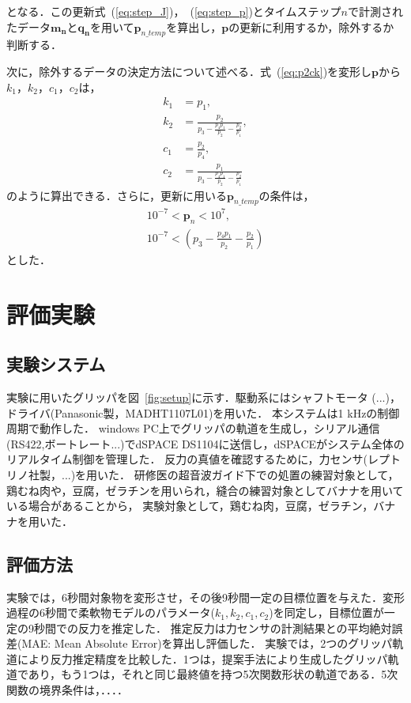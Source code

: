 \documentclass[a4paper]{jarticle}
\begin{document}
となる．この更新式~(\ref{eq:step_J})，~(\ref{eq:step_p})とタイムステップ$n$で計測されたデータ$\mathbf{m_{n}}$と$\mathbf{q_{n}}$を用いて$\mathbf{p}_{n\_temp}$を算出し，$\mathbf{p}$の更新に利用するか，除外するか判断する．

次に，除外するデータの決定方法について述べる．式~(\ref{eq:p2ck})を変形し$\mathbf{p}$から$k_1$，$k_2$，$c_1$，$c_2$は，
\begin{equation}
    \begin{aligned}
        k_1 &= p_1 ,\\
        k_2 &= \frac{p_2}{p_3 - \frac{p_4 p_1}{p_2} - \frac{p_2}{p_1}} ,\\
        c_1 &= \frac{p_2}{p_4},\\
        c_2 &= \frac{p_1}{p_3 - \frac{p_4 p_1}{p_2} - \frac{p_2}{p_1}} 
    \end{aligned}
\end{equation}
のように算出できる．さらに，更新に用いる$\mathbf{p}_{n\_temp}$の条件は，
\begin{equation}
    \begin{aligned}
        10^{-7} < \mathbf{p}_{n} < 10^{7} ,\\
        10^{-7} < \left( p_3 - \frac{p_4 p_1}{p_2} - \frac{p_2}{p_1} \right)
    \end{aligned}
\end{equation}
とした．

\section{評価実験}
\subsection{実験システム}
実験に用いたグリッパを図~\ref{fig:setup}に示す．{\color{red}駆動系にはシャフトモータ (...)}，ドライバ(Panasonic製，MADHT1107L01)を用いた．
本システムは1 kHzの制御周期で動作した．
windows PC上でグリッパの軌道を生成し，シリアル通信(RS422,ボートレート...)でdSPACE DS1104に送信し，dSPACEがシステム全体のリアルタイム制御を管理した．
反力の真値を確認するために，力センサ(レプトリノ社製，...)を用いた．
研修医の超音波ガイド下での処置の練習対象として，鶏むね肉や，豆腐，ゼラチンを用いられ，縫合の練習対象としてバナナを用いている場合があることから\cite{?}\cite{?}\cite{?}，
実験対象として，鶏むね肉，豆腐，ゼラチン，バナナを用いた．
\subsection{評価方法}
実験では，6秒間対象物を変形させ，その後9秒間一定の目標位置を与えた．変形過程の6秒間で柔軟物モデルのパラメータ($k_1, k_2, c_1, c_2$)を同定し，目標位置が一定の9秒間での反力を推定した．
推定反力は力センサの計測結果との平均絶対誤差(MAE: Mean Absolute Error)を算出し評価した．
実験では，2つのグリッパ軌道により反力推定精度を比較した．1つは，提案手法により生成したグリッパ軌道であり，もう1つは，それと同じ最終値を持つ5次関数形状の軌道である．{\color{red}5次関数の境界条件は，．．．．}
\end{document}
